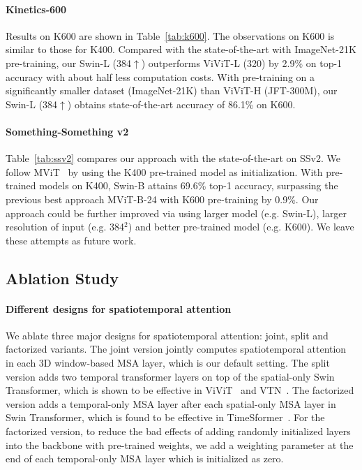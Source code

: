 \documentclass{article}
\begin{document}
\paragraph{Kinetics-600} Results on K600 are shown in Table~\ref{tab:k600}. The observations on K600 is similar to those for K400. Compared with the state-of-the-art with ImageNet-21K pre-training, our Swin-L (384$\uparrow$) outperforms ViViT-L (320) by 2.9\% on top-1 accuracy with about half less computation costs.
With pre-training on a significantly smaller dataset (ImageNet-21K) than ViViT-H (JFT-300M), our Swin-L (384$\uparrow$) obtains state-of-the-art accuracy of 86.1\% on K600.

\paragraph{Something-Something v2} Table~\ref{tab:ssv2} compares our approach with the state-of-the-art on SSv2. We follow MViT~\cite{mvit2021} by using the K400 pre-trained model as initialization. With pre-trained models on K400, Swin-B attains 69.6\% top-1 accuracy, surpassing the previous best approach MViT-B-24 with K600 pre-training by 0.9\%. Our approach could be further improved via using larger model (e.g. Swin-L), larger resolution of input (e.g. 384$^2$) and better pre-trained model (e.g. K600). We leave these attempts as future work.

\subsection{Ablation Study}
\paragraph{Different designs for spatiotemporal attention} We ablate three major designs for spatiotemporal attention: joint, split and factorized variants. The joint version jointly computes spatiotemporal attention in each 3D window-based MSA layer, which is our default setting. The split version adds two temporal transformer layers on top of the spatial-only Swin Transformer, which is shown to be effective in ViViT~\cite{arnab2021vivit} and VTN~\cite{neimark2021VTN}. The factorized version adds a temporal-only MSA layer after each spatial-only MSA layer in Swin Transformer, which is found to be effective in TimeSformer~\cite{timesformer2021}.
For the factorized version, to reduce the bad effects of adding randomly initialized layers into the backbone with pre-trained weights, we add a weighting parameter at the end of each temporal-only MSA layer which is initialized as zero.
\end{document}
